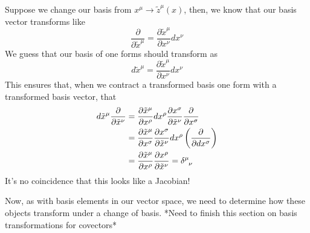 \documentclass[11pt, a4paper]{article}   	%
\theoremstyle{slplain}
\begin{document}
Suppose we change our basis from $ x^\mu \to \tilde{z}^\mu ( x)  $, 
then, we know that our basis vector transforms like 
\[
\frac{\partial }{\partial \tilde{x }^\mu }  = \frac{\partial \tilde{x }^\mu }{\partial x^\nu} dx^\nu  
\] We guess that our basis of one forms 
should transform as 
\[
d \tilde{x }^\mu = \frac{\partial \tilde{x}^\mu }{\partial x^\nu} dx^\nu  
\] This ensures that, when we contract a transformed basis one form 
with a transformed basis vector, that
\begin{align*}
d \tilde{x }^\mu \frac{\partial }{\partial \tilde{x }^\nu } &=  \frac{\partial \tilde{x }^\mu}{ \partial x^\rho} dx^\rho \frac{\partial x^\sigma}{\partial \tilde{x }^\nu } \frac{\partial }{\partial x^\sigma}    \\
							    &=  \frac{\partial \tilde{x }^\mu }{\partial x^\sigma} \frac{\partial x^\sigma}{\partial \tilde{ x}^\nu } dx^\rho \left( \frac{\partial }{\partial dx^\sigma}  \right)    \\
							    &=  \frac{\partial \tilde{x}^\mu }{\partial x^\rho} \frac{\partial x^\rho}{\partial \tilde{x }^\nu }  = \delta \indices{^\mu_\nu} 
\end{align*} It's no coincidence that this looks like a Jacobian! 

Now, as with basis elements in our vector space, 
we need to determine how these objects transform under a change of basis. 
*Need to finish this section on basis transformations for covectors* 
\end{document}
